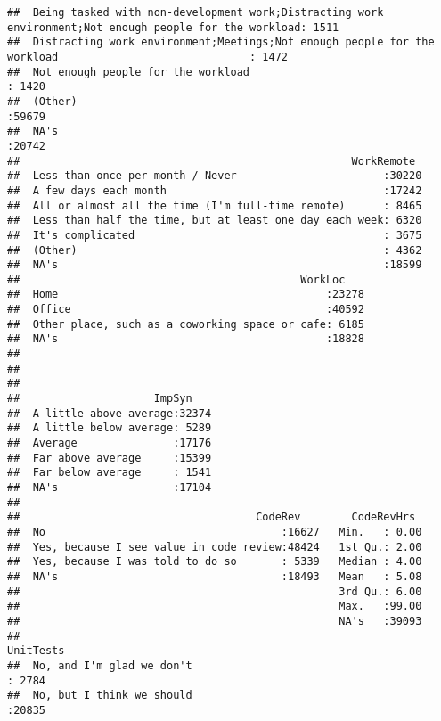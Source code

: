 \documentclass[]{article}
\begin{document}
\begin{verbatim}
##  Being tasked with non-development work;Distracting work environment;Not enough people for the workload: 1511  
##  Distracting work environment;Meetings;Not enough people for the workload                              : 1472  
##  Not enough people for the workload                                                                    : 1420  
##  (Other)                                                                                               :59679  
##  NA's                                                                                                  :20742  
##                                                    WorkRemote   
##  Less than once per month / Never                       :30220  
##  A few days each month                                  :17242  
##  All or almost all the time (I'm full-time remote)      : 8465  
##  Less than half the time, but at least one day each week: 6320  
##  It's complicated                                       : 3675  
##  (Other)                                                : 4362  
##  NA's                                                   :18599  
##                                            WorkLoc     
##  Home                                          :23278  
##  Office                                        :40592  
##  Other place, such as a coworking space or cafe: 6185  
##  NA's                                          :18828  
##                                                        
##                                                        
##                                                        
##                     ImpSyn     
##  A little above average:32374  
##  A little below average: 5289  
##  Average               :17176  
##  Far above average     :15399  
##  Far below average     : 1541  
##  NA's                  :17104  
##                                
##                                     CodeRev        CodeRevHrs   
##  No                                     :16627   Min.   : 0.00  
##  Yes, because I see value in code review:48424   1st Qu.: 2.00  
##  Yes, because I was told to do so       : 5339   Median : 4.00  
##  NA's                                   :18493   Mean   : 5.08  
##                                                  3rd Qu.: 6.00  
##                                                  Max.   :99.00  
##                                                  NA's   :39093  
##                                                                    UnitTests    
##  No, and I'm glad we don't                                              : 2784  
##  No, but I think we should                                              :20835  

\end{verbatim}
\end{document}
